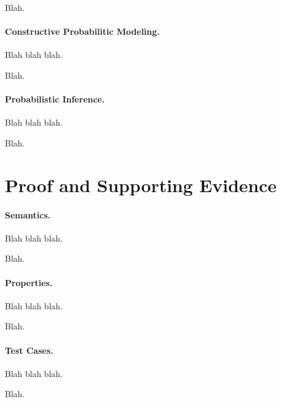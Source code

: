 Blah.

\paragraph{Constructive Probabilitic Modeling.} Blah blah blah.

Blah.

\paragraph{Probabilistic Inference.} Blah blah blah.

Blah.

\section{Proof and Supporting Evidence}

\paragraph{Semantics.} Blah blah blah.

Blah.

\paragraph{Properties.} Blah blah blah.

Blah.

\paragraph{Test Cases.} Blah blah blah.

Blah.
